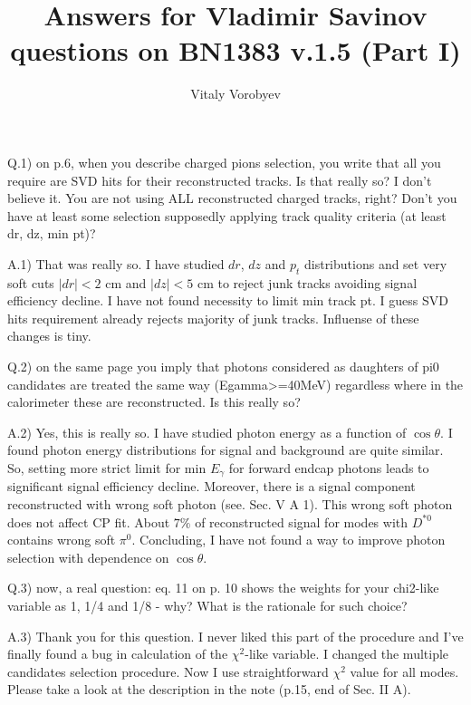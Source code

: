 \documentclass[a4paper,12pt]{article}
\title{Answers for Vladimir Savinov questions on BN1383 v.1.5 (Part I)}
\author{Vitaly Vorobyev}
\begin{document}
\maketitle

Q.1) on p.6, when you describe charged pions selection, you write that all you require are SVD hits for their reconstructed tracks. 
Is that really so? I don't believe it. You are not using ALL reconstructed charged tracks, right? Don't you have at least some selection supposedly applying track quality criteria (at least dr, dz, min pt)?

A.1) That was really so. I have studied $dr$, $dz$ and $p_t$ distributions and set very soft cuts $|dr|<2$ cm and $|dz|<5$ cm to reject junk tracks avoiding signal efficiency decline. I have not found necessity to limit min track pt. I guess SVD hits requirement already rejects majority of junk tracks. Influense of these changes is tiny.

Q.2) on the same page you imply that photons considered as daughters of pi0 candidates are treated the same way (Egamma>=40MeV) regardless where in the calorimeter these are reconstructed. Is this really so?

A.2) Yes, this is really so. I have studied photon energy as a function of $\cos\theta$. I found photon energy distributions for signal and background are quite similar. So, setting more strict limit for min $E_{\gamma}$ for forward endcap photons leads to significant signal efficiency decline. Moreover, there is a signal component reconstructed with wrong soft photon (see. Sec. V A 1). This wrong soft photon does not affect CP fit. About $7\%$ of reconstructed signal for modes with $D^{*0}$ contains wrong soft $\pi^0$. Concluding, I have not found a way to improve photon selection with dependence on $\cos\theta$.


Q.3) now, a real question: eq. 11 on p. 10 shows the weights for your chi2-like variable as 1, 1/4 and 1/8 - why? What is the rationale for such choice?

A.3) Thank you for this question. I never liked this part of the procedure and I've finally found a bug in calculation of the $\chi^2$-like variable. I changed the multiple candidates selection procedure. Now I use straightforward $\chi^2$ value for all modes. Please take a look at the description in the note (p.15, end of Sec. II A).
\end{document}

